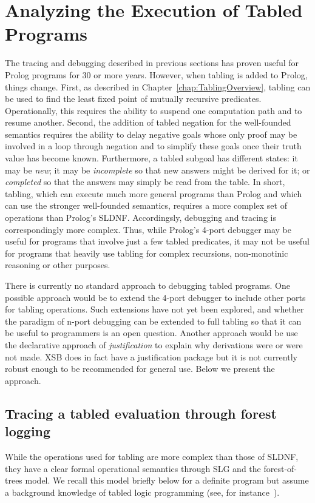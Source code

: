 \section{Analyzing the Execution of Tabled Programs} \label{sec:forest-trace}
%
The tracing and debugging described in previous sections has proven
useful for Prolog programs for 30 or more years.  However, when
tabling is added to Prolog, things change.  First, as described in
Chapter~\ref{chap:TablingOverview}, tabling can be used to find the
least fixed point of mutually recursive predicates.  Operationally,
this requires the ability to suspend one computation path and to
resume another.  Second, the addition of tabled negation for the
well-founded semantics requires the ability to delay negative goals
whose only proof may be involved in a loop through negation and to
simplify these goals once their truth value has become
known. Furthermore, a tabled subgoal has different states: it may be
{\em new}; it may be {\em incomplete} so that new answers might be
derived for it; or {\em completed} so that the answers may simply be
read from the table.  In short, tabling, which can execute much more
general programs than Prolog and which can use the stronger
well-founded semantics, requires a more complex set of operations than
Prolog's SLDNF.  Accordingsly, debugging and tracing is
correspondingly more complex.  Thus, while Prolog's 4-port debugger
may be useful for programs that involve just a few tabled predicates,
it may not be useful for programs that heavily use tabling for complex
recursions, non-monotinic reasoning or other purposes.

There is currently no standard approach to debugging tabled programs.
One possible approach would be to extend the 4-port debugger to
include other ports for tabling operations.  Such extensions have not
yet been explored, and whether the paradigm of n-port debugging can be
extended to full tabling so that it can be useful to programmers is an
open question.  Another approach would be use the declarative approach
of {\em justification} \cite{GuRR01,PGDRR04} to explain why
derivations were or were not made.  XSB does in fact have a
justification package but it is not currently robust enough to be
recommended for general use.  Below we present the {\tt \ctrace}
approach.

\subsection{Tracing a tabled evaluation through forest logging}
%
While the operations used for tabling are more complex than those of
SLDNF, they have a clear formal operational semantics through SLG and
the forest-of-trees model.  We recall this model briefly below for a
definite program but assume a background knowledge of tabled logic
programming (see, for instance~\cite{SwiW10}).

